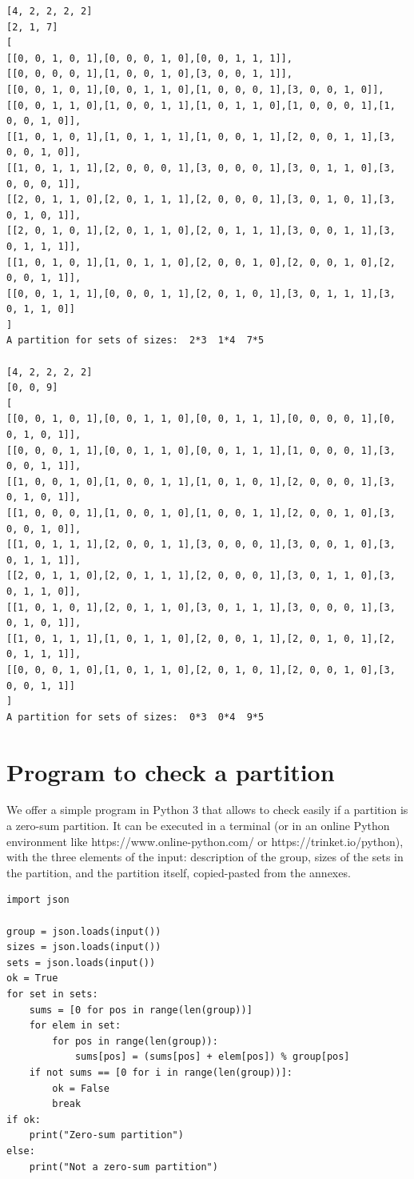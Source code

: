 \documentclass[final]{dmtcs-episciences}
\begin{document}
\begin{appendices}
\begin{verbatim}
[4, 2, 2, 2, 2]
[2, 1, 7]
[
[[0, 0, 1, 0, 1],[0, 0, 0, 1, 0],[0, 0, 1, 1, 1]],
[[0, 0, 0, 0, 1],[1, 0, 0, 1, 0],[3, 0, 0, 1, 1]],
[[0, 0, 1, 0, 1],[0, 0, 1, 1, 0],[1, 0, 0, 0, 1],[3, 0, 0, 1, 0]],
[[0, 0, 1, 1, 0],[1, 0, 0, 1, 1],[1, 0, 1, 1, 0],[1, 0, 0, 0, 1],[1, 0, 0, 1, 0]],
[[1, 0, 1, 0, 1],[1, 0, 1, 1, 1],[1, 0, 0, 1, 1],[2, 0, 0, 1, 1],[3, 0, 0, 1, 0]],
[[1, 0, 1, 1, 1],[2, 0, 0, 0, 1],[3, 0, 0, 0, 1],[3, 0, 1, 1, 0],[3, 0, 0, 0, 1]],
[[2, 0, 1, 1, 0],[2, 0, 1, 1, 1],[2, 0, 0, 0, 1],[3, 0, 1, 0, 1],[3, 0, 1, 0, 1]],
[[2, 0, 1, 0, 1],[2, 0, 1, 1, 0],[2, 0, 1, 1, 1],[3, 0, 0, 1, 1],[3, 0, 1, 1, 1]],
[[1, 0, 1, 0, 1],[1, 0, 1, 1, 0],[2, 0, 0, 1, 0],[2, 0, 0, 1, 0],[2, 0, 0, 1, 1]],
[[0, 0, 1, 1, 1],[0, 0, 0, 1, 1],[2, 0, 1, 0, 1],[3, 0, 1, 1, 1],[3, 0, 1, 1, 0]]
]
A partition for sets of sizes:  2*3  1*4  7*5

[4, 2, 2, 2, 2]
[0, 0, 9]
[
[[0, 0, 1, 0, 1],[0, 0, 1, 1, 0],[0, 0, 1, 1, 1],[0, 0, 0, 0, 1],[0, 0, 1, 0, 1]],
[[0, 0, 0, 1, 1],[0, 0, 1, 1, 0],[0, 0, 1, 1, 1],[1, 0, 0, 0, 1],[3, 0, 0, 1, 1]],
[[1, 0, 0, 1, 0],[1, 0, 0, 1, 1],[1, 0, 1, 0, 1],[2, 0, 0, 0, 1],[3, 0, 1, 0, 1]],
[[1, 0, 0, 0, 1],[1, 0, 0, 1, 0],[1, 0, 0, 1, 1],[2, 0, 0, 1, 0],[3, 0, 0, 1, 0]],
[[1, 0, 1, 1, 1],[2, 0, 0, 1, 1],[3, 0, 0, 0, 1],[3, 0, 0, 1, 0],[3, 0, 1, 1, 1]],
[[2, 0, 1, 1, 0],[2, 0, 1, 1, 1],[2, 0, 0, 0, 1],[3, 0, 1, 1, 0],[3, 0, 1, 1, 0]],
[[1, 0, 1, 0, 1],[2, 0, 1, 1, 0],[3, 0, 1, 1, 1],[3, 0, 0, 0, 1],[3, 0, 1, 0, 1]],
[[1, 0, 1, 1, 1],[1, 0, 1, 1, 0],[2, 0, 0, 1, 1],[2, 0, 1, 0, 1],[2, 0, 1, 1, 1]],
[[0, 0, 0, 1, 0],[1, 0, 1, 1, 0],[2, 0, 1, 0, 1],[2, 0, 0, 1, 0],[3, 0, 0, 1, 1]]
]
A partition for sets of sizes:  0*3  0*4  9*5
\end{verbatim}



\section{Program to check a partition}\label{a:program}
\normalsize
We offer a simple program in Python 3 that allows to check easily if a partition is a zero-sum partition. It can be executed in a terminal (or in an online Python environment like https://www.online-python.com/ or https://trinket.io/python), with the three elements of the input: description of the group, sizes of the sets in the partition, and the partition itself, copied-pasted from the annexes.
\scriptsize
\begin{verbatim}
import json

group = json.loads(input())
sizes = json.loads(input())
sets = json.loads(input())
ok = True
for set in sets:
    sums = [0 for pos in range(len(group))]
    for elem in set:
        for pos in range(len(group)):
            sums[pos] = (sums[pos] + elem[pos]) % group[pos]
    if not sums == [0 for i in range(len(group))]:
        ok = False
        break
if ok:
    print("Zero-sum partition")
else:
    print("Not a zero-sum partition")
\end{verbatim}

\end{appendices}
\end{document}
